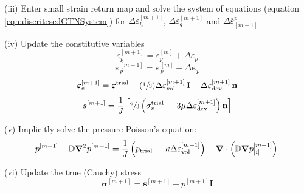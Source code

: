 \documentclass[sn-mathphys,Numbered,draft]{sn-jnl}%
\newcommand{\bb}{\boldsymbol}
\begin{document}
\begin{algorithm}[htbp]
(iii) Enter small strain return map and solve the system of equations (equation \ref{eqn:discritesedGTNSystem}) for $\Delta {\varepsilon}^{[m+1]}_h$, $\Delta {\varepsilon}^{[m+1]}_q$ and $\Delta \overline{{\varepsilon}}^p_{[m+1]}$


(iv) Update the constitutive variables
\begin{equation}
	\bar{\varepsilon}_p^{[m+1]} = \bar{\varepsilon}_p^{[m]} + \Delta \bar{\varepsilon}_p \nonumber
\end{equation}
\begin{equation}
	\bb{\varepsilon}_p^{[m+1]} = \bb{\varepsilon}_p^{[m]} +\Delta \bb{\varepsilon}_p \nonumber
\end{equation}
\begin{equation}
	\boldsymbol{\varepsilon}_{e}^{[m+1]} = \boldsymbol{\varepsilon}^{\text{trial}}
	- (\sfrac{1}{3}) \Delta {\varepsilon}^{[m+1]}_\text{vol} \, \mathbf{I}
	- \Delta {\varepsilon}^{[m+1]}_\text{dev} \, \mathbf{n}\nonumber
\end{equation}
\begin{equation}
	\boldsymbol{s}^{[m+1]} =
	\frac{1}{J}
	\left[
		\sfrac{2}{3} \left(\sigma_v^{\text {trial }} - 3 \mu \Delta \varepsilon^{[m+1]}_\text{dev} \right) \mathbf{n}
	\right] \nonumber
\end{equation}


(v) Implicitly solve the pressure Poisson's equation:
\begin{equation}
	p^{[m+1]} - \mathbb{D} \bb{\nabla}^2 p^{[m+1]} =
	\frac{1}{J}\left(p_{\text {trial }} - \kappa \Delta \varepsilon^{[m+1]}_{\text{vol}} \right)
	- \bb{\nabla} \cdot \left( \mathbb{D} \bb{\nabla} p^{[m+1]}_{[i]} \right) \\
\end{equation}


(vi) Update the true (Cauchy) stress
\begin{equation}
	\boldsymbol{\sigma}^{[m+1]} = \boldsymbol{s}^{[m+1]} -  p^{[m+1]}\textbf{I} \nonumber
\end{equation}



\end{algorithm}
\end{document}
